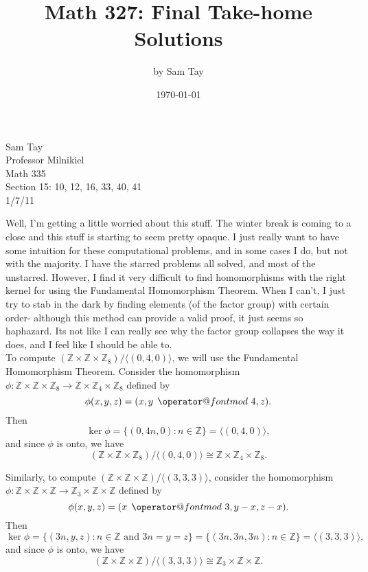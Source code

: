 \documentclass{article}
\title{Math 327: Final Take-home Solutions}
\author{by Sam Tay}
\date{\today}
\makeatletter
\newenvironment{problem1}[1]{\noindent {\bf Problem #1:}}
{\medskip}
\def\imod#1{\allowbreak\mkern8mu{\operator@font mod}\,\,#1}
\makeatother
\begin{document}
\begin{flushright}Sam Tay\\ Professor Milnikiel \\ Math 335 \\ Section 15: 10, 12, 16, 33, 40, 41\\ 1/7/11
\end{flushright}

Well, I'm getting a little worried about this stuff. The winter break is coming to a close and this stuff is starting to seem pretty opaque. I just really want to have some intuition for these computational problems, and in some cases I do, but not with the majority. I have the starred problems all solved, and most of the unstarred. However, I find it very difficult to find homomorphisms with the right kernel for using the Fundamental Homomorphism Theorem. When I can't, I just try to stab in the dark by finding elements (of the factor group) with certain order- although this method can provide a valid proof, it just seems so haphazard. Its not like I can really see why the factor group collapses the way it does, and I feel like I should be able to.\\

\begin{problem1}{10} To compute $(\mathbb{Z}\times\mathbb{Z}\times\mathbb{Z}_8)/\langle (0,4,0)\rangle$, we will use the Fundamental Homomorphism Theorem. Consider the homomorphism $\phi:\mathbb{Z}\times\mathbb{Z}\times\mathbb{Z}_8\to\mathbb{Z}\times\mathbb{Z}_4\times\mathbb{Z}_8$ defined by $$\phi(x,y,z) = (x, y\imod{4}, z).$$ Then $$\ker\phi=\{(0,4n,0) : n\in\mathbb{Z}\}=\langle (0, 4, 0) \rangle,$$ and since $\phi$ is onto, we have $$(\mathbb{Z}\times\mathbb{Z}\times\mathbb{Z}_8)/\langle (0,4,0)\rangle \cong \mathbb{Z}\times\mathbb{Z}_4\times\mathbb{Z}_8.$$

\end{problem1}


\begin{problem1}{12} Similarly, to compute $(\mathbb{Z}\times\mathbb{Z}\times\mathbb{Z})/\langle (3,3,3)\rangle$, consider the homomorphism $\phi:\mathbb{Z}\times\mathbb{Z}\times\mathbb{Z}\to\mathbb{Z}_3\times\mathbb{Z}\times\mathbb{Z}$ defined by $$\phi(x,y,z) = (x\imod{3}, y-x, z-x).$$ Then $$\ker\phi=\{(3n,y,z) : n\in\mathbb{Z}\text{ and } 3n=y=z\}=\{(3n,3n,3n) : n\in\mathbb{Z}\}=\langle (3,3,3) \rangle,$$ and since $\phi$ is onto, we have $$(\mathbb{Z}\times\mathbb{Z}\times\mathbb{Z})/\langle (3,3,3)\rangle \cong \mathbb{Z}_3\times\mathbb{Z}\times\mathbb{Z}.$$

\end{problem1}
\end{document}
